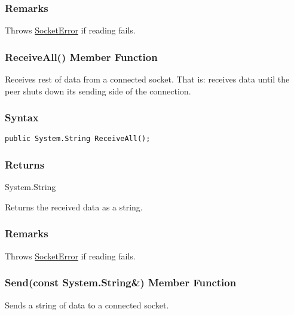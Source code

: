 \documentclass[a4paper,oneside,11.000000pt]{book}
\begin{document}
\subsubsection*{Remarks}
\begin{flushleft}
Throws \hyperlink{System.Net.Sockets.SocketError}{SocketError} if reading fails.

\end{flushleft}
\clearpage

\hypertarget{System.Net.Sockets.TcpSocket.ReceiveAll.P.System.Net.Sockets.TcpSocket}{\subsubsection*{ReceiveAll() Member Function}}
\begin{flushleft}
Receives rest of data from a connected socket.
That is: receives data until the peer shuts down its sending side of the connection.

\end{flushleft}
\subsubsection*{Syntax}\texttt{public System.String ReceiveAll();}

\subsubsection*{Returns}System.\-String
\begin{flushleft}
Returns the received data as a string.

\end{flushleft}
\subsubsection*{Remarks}
\begin{flushleft}
Throws \hyperlink{System.Net.Sockets.SocketError}{SocketError} if reading fails.

\end{flushleft}
\clearpage

\hypertarget{System.Net.Sockets.TcpSocket.Send.P.System.Net.Sockets.TcpSocket.C.R.System.String}{\subsubsection*{Send(const System.String\&) Member Function}}
\begin{flushleft}
Sends a string of data to a connected socket.

\end{flushleft}
\end{document}
